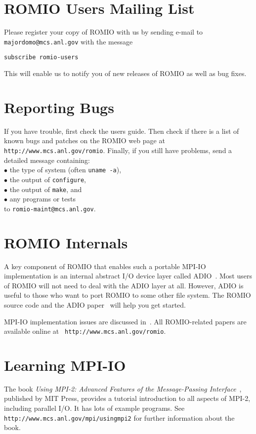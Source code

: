 %
%
\section{ROMIO Users Mailing List}
Please register your copy of ROMIO with us by sending e-mail
to {\tt majordomo@mcs.anl.gov} with the message

{\tt subscribe romio-users}

{\noindent This} will enable us to notify you of new releases of ROMIO
as well as bug fixes.


%
%
\section{Reporting Bugs}
If you have trouble, first check the users guide. Then check if there
is a list of known bugs and patches on the ROMIO web page at {\tt http://www.mcs.anl.gov/romio}.
Finally, if you still have problems, send a detailed message containing:\\
\hspace*{.2in}$\bullet$ the type of system (often {\tt uname -a}),\\
\hspace*{.2in}$\bullet$ the output of {\tt configure},\\
\hspace*{.2in}$\bullet$ the output of {\tt make}, and \\
\hspace*{.2in}$\bullet$ any programs or tests\\
to {\tt romio-maint@mcs.anl.gov}.


%
%
\section{ROMIO Internals}
A key component of ROMIO that enables such a portable MPI-IO
implementation is an internal abstract I/O device layer called
ADIO~\cite{thak96e}. Most users of ROMIO will not need to deal with
the ADIO layer at all. However, ADIO is useful to those who want to
port ROMIO to some other file system. The ROMIO source code and the
ADIO paper~\cite{thak96e} will help you get started.

MPI-IO implementation issues are discussed in~\cite{thak99b}. All
ROMIO-related papers are available online at {\tt
http://www.mcs.anl.gov/romio}.


\section{Learning MPI-IO}
The book {\em Using MPI-2: Advanced Features of the Message-Passing
Interface}~\cite{grop99a}, published by MIT Press, provides a tutorial
introduction to all aspects of MPI-2, including parallel I/O. It has
lots of example programs. See {\tt
http://www.mcs.anl.gov/mpi/usingmpi2} for further information about
the book.

